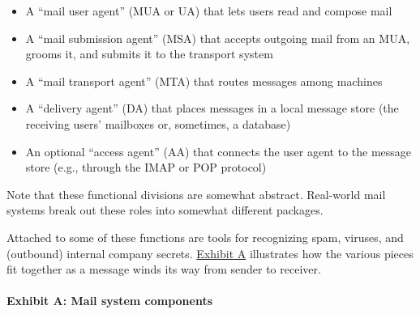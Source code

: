 \begin{itemize}
\item
  A
  ``\protect\hypertarget{part0026_split_001.htmlux5cux23_idIndexMarker2385}{}{}\protect\hypertarget{part0026_split_001.htmlux5cux23_idIndexMarker2386}{}{}\protect\hypertarget{part0026_split_001.htmlux5cux23_idIndexMarker2387}{}{}mail
  user agent'' (MUA or UA) that lets users read and compose mail
\item
  A
  ``\protect\hypertarget{part0026_split_001.htmlux5cux23_idIndexMarker2388}{}{}\protect\hypertarget{part0026_split_001.htmlux5cux23_idIndexMarker2389}{}{}mail
  submission agent'' (MSA) that accepts outgoing mail from an MUA,
  grooms it, and submits it to the transport system
\item
  A
  ``\protect\hypertarget{part0026_split_001.htmlux5cux23_idIndexMarker2390}{}{}\protect\hypertarget{part0026_split_001.htmlux5cux23_idIndexMarker2391}{}{}mail
  transport agent'' (MTA) that routes messages among machines
\item
  A
  ``\protect\hypertarget{part0026_split_001.htmlux5cux23_idIndexMarker2392}{}{}\protect\hypertarget{part0026_split_001.htmlux5cux23_idIndexMarker2393}{}{}delivery
  agent'' (DA) that places messages in a local message store (the
  receiving users' mailboxes or, sometimes, a database)
\item
  An optional
  ``\protect\hypertarget{part0026_split_001.htmlux5cux23_idIndexMarker2394}{}{}\protect\hypertarget{part0026_split_001.htmlux5cux23_idIndexMarker2395}{}{}access
  agent'' (AA) that connects the user agent to the message store (e.g.,
  through the IMAP or POP protocol)
\end{itemize}

Note that these functional divisions are somewhat abstract. Real-world
mail systems break out these roles into somewhat different packages.

Attached to some of these functions are tools for recognizing spam,
viruses, and (outbound) internal company secrets.
\protect\hyperlink{part0026_split_001.htmlux5cux23_idTextAnchor1003}{Exhibit
A} illustrates how the various pieces fit together as a message winds
its way from sender to
receiver.\protect\hypertarget{part0026_split_001.htmlux5cux23_idIndexMarker2396}{}{}

\paragraph[{Exhibit A: }Mail system components]{\texorpdfstring{{Exhibit
A:
}\protect\hypertarget{part0026_split_001.htmlux5cux23_idTextAnchor1003}{}{}Mail
system components}{Exhibit A: Mail system components}}

